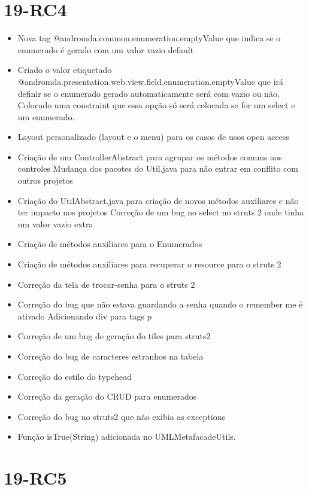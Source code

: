 \section{19-RC4}

\begin{itemize}
  \item Nova tag @andromda.common.enumeration.emptyValue que indica se o enumerado é gerado com um valor vazio default
  \item Criado o valor etiquetado
@andromda.presentation.web.view.field.enumeration.emptyValue que irá definir se o enumerado gerado automaticamente será com vazio ou não. Colocado uma constraint que essa opção só será colocada se for um select e um enumerado.
  \item Layout personalizado (layout e o menu) para os casos de usos open access
  \item Criação de um ControllerAbstract para agrupar os métodos comuns aos
controles Mudança dos pacotes do Util.java para não entrar em conflito com outros projetos
  \item Criação do UtilAbstract.java para criação de novos métodos auxiliares e
não ter impacto nos projetos Correção de um bug no select no struts 2 onde tinha um valor vazio extra 
  \item Criação de métodos auxiliares para o Enumerados
  \item Criação de métodos auxiliares para recuperar o resource para o struts 2
  \item Correção da tela de trocar-senha para o struts 2
  \item Correção do bug que não estava guardando a senha quando o remember me é
ativado Adicionando div para tags p
  \item Correção de um bug de geração do tiles para struts2
  \item Correção do bug de caracteres estranhos na tabela
  \item Correção do estilo do typehead
  \item Correção da geração do CRUD para enumerados 
  \item Correção do bug no struts2 que não exibia as exceptions
  \item Função isTrue(String) adicionada no UMLMetafacadeUtils.
\end{itemize}

\section{19-RC5}


